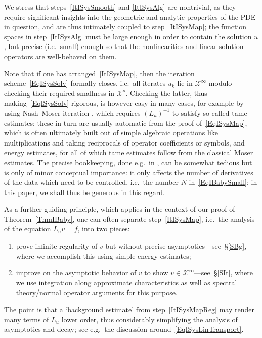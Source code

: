 \documentclass[reqno,11pt,letterpaper]{amsart}
\makeatletter
\newcommand{\myitem}[3]{\item[#2]\def\@currentlabel{#3}\label{#1}}
\numberwithin{equation}{section}
\numberwithin{figure}{section}
\theoremstyle{definition}
\theoremstyle{remark}
\newcommand{\mc}{\mathcal}
\newcommand{\cX}{\mc X}
\makeatother
\begin{document}
We stress that steps~\ref{ItISysSmooth} and \ref{ItISysAlg} are nontrivial, as they require significant insights into the geometric and analytic properties of the PDE in question, and are thus intimately coupled to step~\ref{ItISysMap}; the function spaces in step~\ref{ItISysAlg} must be large enough in order to contain the solution $u$, but precise (i.e.\ small) enough so that the nonlinearities and linear solution operators are well-behaved on them.

Note that if one has arranged~\ref{ItISysMap}, then the iteration scheme~\eqref{EqISysSolv} formally closes, i.e.\ all iterates $u_k$ lie in $\cX^\infty$ modulo checking their required smallness in $\cX^s$. Checking the latter, thus making~\eqref{EqISysSolv} rigorous, is however easy in many cases, for example by using Nash--Moser iteration \cite{HamiltonNashMoser,SaintRaymondNashMoser}, which requires $(L_u)^{-1}$ to satisfy so-called tame estimates; these in turn are usually automatic from the proof of~\eqref{EqISysMap}, which is often ultimately built out of simple algebraic operations like multiplications and taking reciprocals of operator coefficients or symbols, and energy estimates, for all of which tame estimates follow from the classical Moser estimates. The precise bookkeeping, done e.g.\ in \cite{HintzVasyQuasilinearKdS}, can be somewhat tedious but is only of minor conceptual importance: it only affects the number of derivatives of the data which need to be controlled, i.e.\ the number $N$ in~\eqref{EqIBabySmall}; in this paper, we shall thus be generous in this regard.

As a further guiding principle, which applies in the context of our proof of Theorem~\ref{ThmIBaby}, one can often separate step~\ref{ItISysMap}, i.e.\ the analysis of the equation $L_u v=f$, into two pieces:
\begin{enumerate}
\myitem{ItISysMapReg}{3.1.}{3.1} prove infinite regularity of $v$ but without precise asymptotics---see~\S\ref{SBg}, where we accomplish this using simple energy estimates;
\myitem{ItISysMapDec}{3.2.}{3.2} improve on the asymptotic behavior of $v$ to show $v\in\cX^\infty$---see~\S\ref{SIt}, where we use integration along approximate characteristics as well as spectral theory/normal operator arguments for this purpose.
\end{enumerate}

The point is that a `background estimate' from step~\ref{ItISysMapReg} may render many terms of $L_u$ lower order, thus considerably simplifying the analysis of asymptotics and decay; see e.g.\ the discussion around~\eqref{EqISysLinTransport}.
\end{document}

